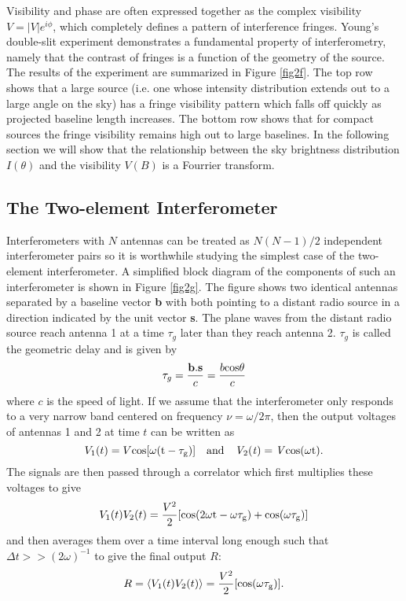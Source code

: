 Visibility and phase are often expressed together as the complex visibility $V=|V|e^{i\phi}$, which completely defines a pattern of interference fringes. Young's double-slit experiment demonstrates a fundamental property of interferometry, namely that the contrast of fringes is a function of the geometry of the source. The results of the experiment are summarized in Figure \ref{fig2f}. The top row shows that a large source (i.e. one whose intensity distribution extends out to a large angle on the sky) has a fringe visibility pattern which falls off quickly as projected baseline length increases. The bottom row shows that for compact sources the fringe visibility remains high out to large baselines. In the following section we will show that the relationship between the sky brightness distribution $I(\theta)$ and the visibility $V(B)$ is a Fourrier transform.

\subsection{The Two-element Interferometer}\label{subsec:5}
Interferometers with $N$ antennas can be treated as $N(N-1)/2$ independent interferometer pairs so it is worthwhile studying the simplest case of the two-element interferometer. A simplified block diagram of the components of such an interferometer is shown in Figure \ref{fig2g}. The figure shows two identical antennas separated by a baseline vector \textbf{b} with both pointing to a distant radio source in a direction indicated by the unit vector \textbf{s}. The plane waves from the distant radio source reach antenna 1 at a time $\tau _g$ later than they reach antenna 2. $\tau _g$ is called the geometric delay and is given by
\begin{equation}
\tau _{g}=\frac{\textbf{b}.\textbf{s}}{c}=\frac{b\rm{cos}\theta}{c}
\end{equation}
where $c$ is the speed of light. If we assume that the interferometer only responds to a very narrow band centered on frequency $\nu=\omega /2\pi$, then the output voltages of antennas 1 and 2 at time $t$ can be written as 
\begin{equation}
V_1(t)=V\rm{cos}[\omega(t-\tau _g)] \ \ \ \rm{and} \ \ \ \mathit{V_{\rm{2}}(t)=V\rm{cos}(\omega t)}.
\end{equation}
The signals are then passed through a correlator which first multiplies these voltages to give
\begin{equation}
V_1(t) V_2(t)=\frac{V^2}{2}[\rm{cos(2\omega t -\omega \tau _g)+\rm{cos}(\omega \tau _g)}]
\end{equation}
and then averages them over a time interval long enough such that $\Delta t >> (2\omega)^{-1}$ to give the final output $R$:
\begin{equation}
R=\langle V_1(t)V_2(t)\rangle = \frac{V^2}{2}[\rm{cos}(\omega \tau _g)].
\end{equation}

